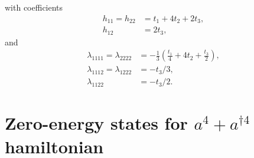 \documentclass[aps,prb,twocolumn,letterpaper,twoside,nobalancelastpage,groupedaddress,amsmath,amssymb,floatfix,citeautoscript]{revtex4-1}
\begin{document}
with coefficients
\begin{align*}
h_{11} = h_{22} &= t_1 + 4t_2 + 2t_3,\\
h_{12} &= 2t_3,
\end{align*}
and 
\begin{align*}
\lambda_{1111} = \lambda_{2222} &= -\frac{1}{3}\left(\frac{t_1}{4} + 4t_2 + \frac{t_3}{2} \right),\\
\lambda_{1112}  = \lambda_{1222} &= -t_3/3,\\
\lambda_{1122} &= -t_3/2.
\end{align*}


\section{Zero-energy states for $a^4 + a^{\dag 4}$ hamiltonian}
\label{zero-enegy-quartic}

\newcommand{\be}{\begin{eqnarray*}}
\newcommand{\ee}{\end{eqnarray*}}
\newcommand{\beq}{\begin{eqnarray}}
\newcommand{\eeq}{\end{eqnarray}}

\newcommand{\h}{\hat{H}}
\newcommand{\hp}{\hat{P}}
\newcommand{\up}{\uparrow}
\newcommand{\down}{\downarrow}
\newcommand{\ph}{{\phantom{\dagger}}}
\newcommand{\hc}{\mathrm{H.c.}}
\newcommand{\an}[1]{\left(a\right^{#1}}
\newcommand{\ad}[1]{\left(a^\dagger\right^{#1}}
\newcommand{\ado}{a^\dagger}
\newcommand{\bdo}{b^\dagger}
\newcommand{\ddp}{\partial}

\newcommand{\kb}[2]{\ket{#1}\!\bra{#2}}
\newcommand{\kbd}[2]{\ket{#2}\!\bra{#1}}

\newcommand{\ketx}[1]{\left|{\frac{\partial^{#1}\tilde{u}_n}{\partial {k_x}^{#1}}}\right\rangle}
\newcommand{\brax}[1]{\left\langle{\frac{\partial^{#1}\tilde{u}_n}{\partial {k_x}^{#1}}}\right|}
\newcommand{\kety}[1]{\left|{\frac{\partial^{#1}\tilde{u}_n}{\partial {k_y}^{#1}}}\right\rangle}
\newcommand{\bray}[1]{\left\langle{\frac{\partial^{#1}\tilde{u}_n}{\partial {k_y}^{#1}}}\right|}

\newcommand{\keto}{\ket{\tilde{u}_n}}
\newcommand{\brao}{\bra{\tilde{u}_n}}
\end{document}
